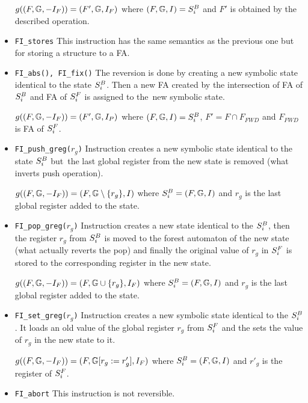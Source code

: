 \begin{itemize}
		$g((F, \mathbb{G}, -I_{F})) = (F', \mathbb{G}, I_{F})$
			where $(F, \mathbb{G}, I) = S^{B}_{i}$ and $F'$ is obtained
			by the described operation.

	
	\item {\tt FI\_stores}
		This instruction has the same semantics as the previous one but for
		storing a structure to a FA.

	\item {\tt FI\_abs(), FI\_fix()}
		The reversion is done by creating a new symbolic state identical to the state $S^{B}_{i}$.
		Then a new FA created by the intersection of FA of $S^{B}_{i}$ and FA of $S^{F}_{i}$ is assigned
		to the~new symbolic state.

		$g((F, \mathbb{G}, -I_{F})) = (F', \mathbb{G}, I_{P})$
			where $(F, \mathbb{G}, I) = S^{B}_{i}$, $F' = F \cap F_{FWD}$ and $F_{FWD}$ is
			FA of $S^{F}_{i}$.

	\item {\tt FI\_push\_greg($r_g$)}
		Instruction creates a new symbolic state identical to the state $S^{B}_{i}$ but~the
		last global register from the new state is removed (what inverts push operation).

		$g((F, \mathbb{G}, -I_{F})) = (F, \mathbb{G} \setminus \{r_g\}, I)$ where $S^{B}_{i} = (F, \mathbb{G}, I)$ and $r_g$
		is the last global register added to the state.

	\item {\tt FI\_pop\_greg($r_g$)}
		Instruction creates a new state identical to the $S^{B}_{i}$,
		then the register $r_g$ from $S^{B}_{i}$ is moved to the
		forest automaton of the new state (what actually reverts the pop)
		and finally the original value of $r_g$ in $S^{F}_{i}$ is stored
		to the corresponding register in the new state.
	
		$g((F, \mathbb{G}, -I_{F})) = (F, \mathbb{G} \cup \{r_g\}, I_{F})$ where $S^{B}_{i} = (F, \mathbb{G}, I)$ and $r_g$
		is the last global register added to the state.
	
	\item {\tt FI\_set\_greg($r_g$)}
		Instruction creates a new symbolic state identical to the $S^{B}_{i}$.
		It loads an old value of the global register $r_g$ from $S^{F}_{i}$
		and the sets the value of $r_g$ in the new state to it.

		$g((F, \mathbb{G}, -I_{F})) = (F, \mathbb{G} [r_{g} := r'_{g}]
		, I_{F})$ where $S^{B}_{i} = (F, \mathbb{G}, I)$ and $r'_{g}$
		is the register of $S^{F}_{i}$.

	\item {\tt FI\_abort}
		This instruction is not reversible.


\end{itemize}
